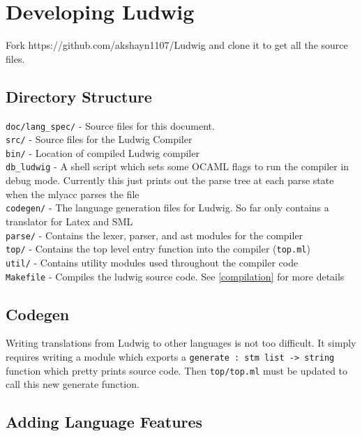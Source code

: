 \section{Developing Ludwig}

Fork https://github.com/akshayn1107/Ludwig and clone it to get all the source files.

\subsection{Directory Structure}

\verb|doc/lang_spec/| - Source files for this document.\\

\verb|src/| - Source files for the Ludwig Compiler\\
\ind \verb|bin/| - Location of compiled Ludwig compiler\\
\ind \ind \verb|db_ludwig| - A shell script which sets some OCAML flags to run the compiler in debug mode. Currently this just prints out the parse tree at each parse state when the mlyacc parses the file\\
\ind \verb|codegen/| - The language generation files for Ludwig. So far only contains a translator for Latex and SML\\
\ind \verb|parse/| - Contains the lexer, parser, and ast modules for the compiler\\
\ind \verb|top/| - Contains the top level entry function into the compiler (\verb|top.ml|)\\
\ind \verb|util/| - Contains utility modules used throughout the compiler code\\
\ind \verb|Makefile| - Compiles the ludwig source code. See \ref{compilation} for more details\\

\subsection{Codegen}

Writing translations from Ludwig to other languages is not too difficult. It simply requires writing a module which exports a \verb|generate : stm list -> string| function which pretty prints source code. Then \verb|top/top.ml| must be updated to call this new generate function.

\subsection{Adding Language Features}


